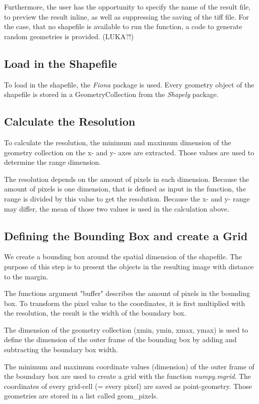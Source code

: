 \documentclass[10pt, a4paper]{article}
\begin{document}
Furthermore, the user has the opportunity to specify the name of the result file, to preview the result inline, as well as suppressing the saving of the tiff file.
For the case, that no shapefile is available to run the function, a code to generate random geometries is provided. (LUKA?!)


\subsection{Load in the Shapefile}
To load in the shapefile, the \textit{Fiona} package is used. Every geometry object of the shapefile is stored in a GeometryCollection from the \emph{Shapely} package.

\subsection{Calculate the Resolution}
To calculate the resolution, the minimum and maximum dimension of the geometry collection on the x- and y- axes are extracted.  Those values are used to determine the range dimension. 

The resolution depends on the amount of pixels in each dimension. Because the amount of pixels is one dimension, that is defined as input in the function, the range is divided by this value to get the resolution. Because the x- and y- range may differ, the mean of those two values is used in the calculation above. 

\subsection{Defining the Bounding Box and create a Grid}
We create a bounding box around the spatial dimension of the shapefile. The purpose of this step is to present the objects in the resulting image with distance to the margin.

The functions argument "buffer" describes the amount of pixels in the bounding box.  To transform the pixel value to the coordinates, it is first multiplied with the resolution, the result is the width of the boundary box.

The dimension of the geometry collection (xmin, ymin, xmax, ymax) is used to define the dimension of the outer frame of the bounding box by adding and subtracting the boundary box width.

The minimum and maximum coordinate values (dimension) of the outer frame of the boundary box are used to create a grid with the function \textit{numpy.mgrid}. The coordinates of every grid-cell (= every pixel) are saved as point-geometry. Those geometries are stored in a list called geom\_pixels.
\end{document}

